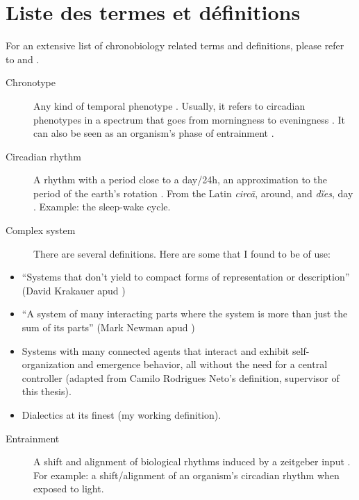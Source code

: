 \documentclass[
12pt,
openright,
oneside,
a4paper,
chapter=TITLE,
section=TITLE,
french,
spanish,
brazil,
english
]{abntex2}\usepackage{array}
\makeatletter
\newlength{\hugeskipamount}
\newcommand{\listadetermosname}{Lista de termos e definições}
\renewcommand{\listadetermosname}{List of terms and definitions}
\renewcommand{\listadetermosname}{Lista de termos e definições}
\renewcommand{\listadetermosname}{Lista de términos y definiciones}
\renewcommand{\listadetermosname}{Liste des termes et définitions}
\renewcommand{\pretextualchapter}[1]{
  \setlength{\afterchapskip}{\hugeskipamount}
  \addtocounter{abntex@bookmarkcounter}{1}
  \PRIVATEbookmarkthis{#1}
  \chapter*[#1]{#1}
}
\newenvironment{termos}{%
  \pretextualchapter{\listadetermosname}
}{
  \cleardoublepage
}
\makeatother
\begin{document}
\begin{termos}

For an extensive list of chronobiology related terms and definitions,
please refer to \textcite{aschoff1965} and \textcite{marques2012}.

\begin{description}
\item[Chronotype]
\hspace{20cm}

Any kind of temporal phenotype \autocite{ehret1974,pittendrigh1993}.
Usually, it refers to circadian phenotypes in a spectrum that goes from
morningness to eveningness \autocite{horne1976,roenneberg2003}. It can
also be seen as an organism's phase of entrainment
\autocite{roenneberg2012a}.
\item[Circadian rhythm]
\hspace{20cm}

A rhythm with a period close to a day/24h, an approximation to the
period of the earth's rotation \autocite{pittendrigh1960}. From the
Latin \emph{circā}, around, and \emph{dĭes}, day \autocite{latinitium}.
Example: the sleep-wake cycle.
\item[Complex system]
\hspace{20cm}

There are several definitions. Here are some that I found to be of use:
\end{description}

\begin{itemize}
\tightlist
\item
  ``Systems that don't yield to compact forms of representation or
  description'' (David Krakauer apud \textcite{mitchell2013})
\item
  ``A system of many interacting parts where the system is more than
  just the sum of its parts'' (Mark Newman apud \textcite{mitchell2013})
\item
  Systems with many connected agents that interact and exhibit
  self-organization and emergence behavior, all without the need for a
  central controller (adapted from Camilo Rodrigues Neto's definition,
  supervisor of this thesis).
\item
  Dialectics at its finest (my working definition).
\end{itemize}

\begin{description}
\item[Entrainment]
\hspace{20cm}

A shift and alignment of biological rhythms induced by a zeitgeber input
\autocite{kuhlman2018}. For example: a shift/alignment of an organism's
circadian rhythm when exposed to light.
\end{description}

\end{termos}
\end{document}
